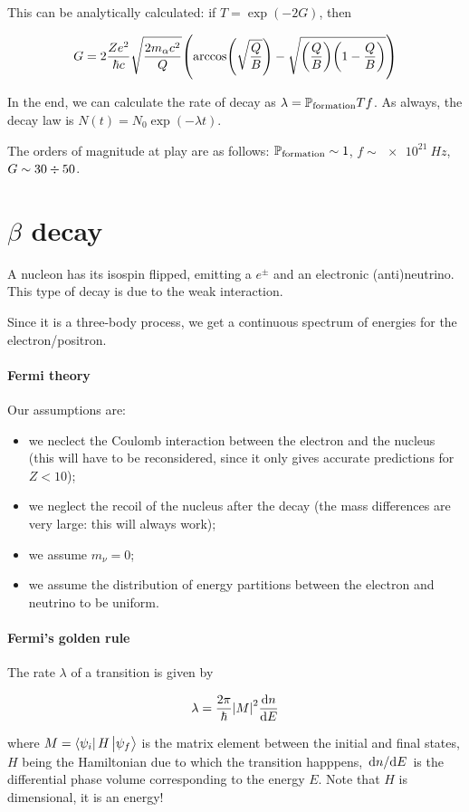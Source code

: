 \documentclass[main.tex]{subfiles}
\begin{document}
This can be analytically calculated: if \(T = \exp(-2G) \), then

\begin{equation}
G = 2 \frac{Ze^2}{\hbar c} \sqrt{\frac{2m_\alpha c^2}{Q}}
\qty(\arccos(\sqrt{\frac{Q}{B}} ) - \sqrt{\qty(\frac{Q}{B}) \qty(1 - \frac{Q}{B})} )
\end{equation}

In the end, we can calculate the rate of decay as \(\lambda = \P _ \text{formation} T f\). As always, the decay law is \(N(t) = N_0 \exp(-\lambda t) \).

The orders of magnitude at play are as follows: \(\P _{\text{formation}} \sim 1 \), \(f \sim \SI{e21}{Hz} \), \(G \sim 30 \divisionsymbol 50\).

\section{\(\beta\) decay}

A nucleon has its isospin flipped, emitting a \(e^{\pm}\) and an electronic (anti)neutrino. This type of decay is due to the weak interaction.

Since it is a three-body process, we get a continuous spectrum of energies for the electron/positron.

\paragraph{Fermi theory}

Our assumptions are:

\begin{itemize}
    \item we neclect the Coulomb interaction between the electron and the nucleus (this will have to be reconsidered, since it only gives accurate predictions for \(Z<10\));
    \item we neglect the recoil of the nucleus after the decay (the mass differences are very large: this will always work);
    \item we assume \(m_\nu = 0\);
    \item we assume the distribution of energy partitions between the electron and neutrino to be uniform.
\end{itemize}

\paragraph{Fermi's golden rule}

The rate \(\lambda\) of a transition is given by

\begin{equation}
    \lambda = \frac{2 \pi}{\hbar} \abs{M}^2 \dv{n}{E}
\end{equation}

where \(M = \bra{\psi_i} H \ket{\psi_f}  \) is the matrix element between the initial and final states, \(H\) being the Hamiltonian due to which the transition happpens, \(\dv*{n}{E} \) is the differential phase volume corresponding to the energy \(E\).
Note that \(H\) is dimensional, it is an energy!

\end{document}
